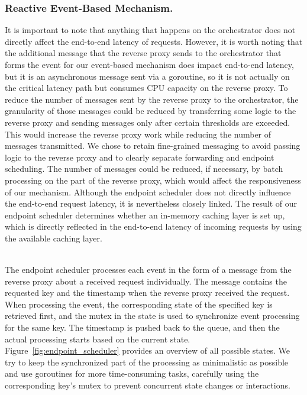 \subsubsection{Reactive Event-Based Mechanism.}
It is important to note that anything that happens on the orchestrator does not directly affect the end-to-end latency of  requests. However, it is worth noting that the additional message that the reverse proxy sends to the orchestrator that forms the event for our event-based mechanism does impact end-to-end latency, but it is an asynchronous message sent via a goroutine, so it is not actually on the critical latency path but consumes CPU capacity on the reverse proxy. To reduce the number of messages sent by the reverse proxy to the orchestrator, the granularity of those messages could be reduced by transferring some logic to the reverse proxy and sending messages only after certain thresholds are exceeded. This would increase the reverse proxy work while reducing the number of messages transmitted. We chose to retain fine-grained messaging to avoid passing logic to the reverse proxy and to clearly separate forwarding and endpoint scheduling. The number of messages could be reduced, if necessary, by batch processing on the part of the reverse proxy, which would affect the responsiveness of our mechanism. Although the endpoint scheduler does not directly influence the end-to-end request latency, it is nevertheless closely linked. The result of our endpoint scheduler determines whether an in-memory caching layer is set up, which is directly reflected in the end-to-end latency of incoming requests by using the available caching layer.

~\\
The endpoint scheduler processes each event in the form of a message from the reverse proxy about a received request individually. The message contains the requested key and the timestamp when the reverse proxy received the request. When processing the event, the corresponding state of the specified key is retrieved first, and the mutex in the state is used to synchronize event processing for the same key. The timestamp is pushed back to the queue, and then the actual processing starts based on the current state. Figure~\ref{fig:endpoint_scheduler} provides an overview of all possible states. We try to keep the synchronized part of the processing as minimalistic as possible and use goroutines for more time-consuming tasks, carefully using the corresponding key's mutex to prevent concurrent state changes or interactions.


